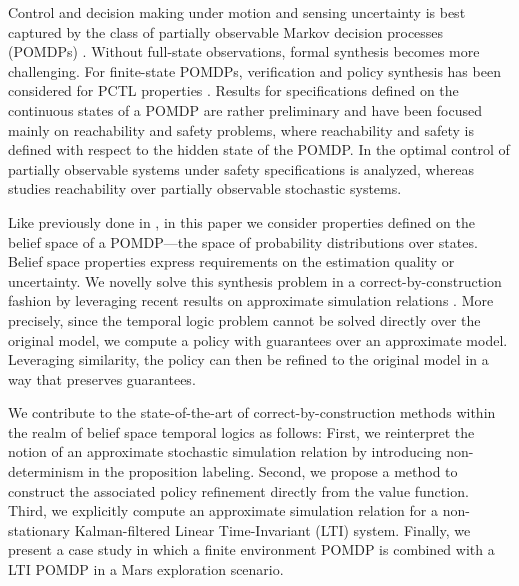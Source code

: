 \documentclass{ifacconf}
\begin{document}
Control and decision making under motion and sensing uncertainty is best captured by the class of partially observable Markov decision processes (POMDPs) \citep{Kaelbling98,Smallwood73}. Without full-state observations, formal synthesis becomes more challenging. For finite-state POMDPs, verification and policy synthesis has been considered for PCTL properties \citep{Norman2017, Chatterjee2014}. Results for specifications defined on the continuous states of a POMDP are rather preliminary and have been focused mainly on reachability and safety problems, where reachability and safety is defined with respect to the hidden state of the POMDP. In \citep{ding2013optimal} the optimal control of partially observable systems under safety specifications is analyzed, whereas \citep{LESSER20141989} studies reachability over partially observable stochastic systems.

Like previously done in  \citep{Vasile2016,JonesDTL2013}, in this paper we consider properties defined on the belief space of a POMDP---the space of probability distributions over states. Belief space properties express requirements on the estimation quality or uncertainty. We novelly solve this synthesis problem in a  correct-by-construction fashion by leveraging recent results on  approximate simulation relations \citep{haesaert2017verification, tech_report_TACAS}.
More precisely, since the temporal logic problem cannot be solved directly over the original model, we compute a policy with guarantees over an approximate model. Leveraging similarity, the policy can then be refined to the original model in a way that preserves guarantees.

We contribute to the state-of-the-art of correct-by-construction methods within the realm of belief space temporal logics as follows: First, we reinterpret the notion of an approximate stochastic simulation relation by introducing non-determinism in the proposition labeling. Second, we propose a method to construct the associated policy refinement directly from the value function. Third, we explicitly compute an approximate simulation relation for a non-stationary Kalman-filtered Linear Time-Invariant (LTI) system. Finally, we present a case study in which a finite environment POMDP is combined with a LTI POMDP in a Mars exploration scenario.

\end{document}
